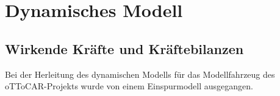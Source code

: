 \chapter{Dynamisches Modell} \label{chap:dynamic}

\section{Wirkende Kräfte und Kräftebilanzen}
\label{sec:Kraefte}
Bei der Herleitung des dynamischen Modells für das Modellfahrzeug des oTToCAR-Projekts wurde von einem Einspurmodell ausgegangen. 